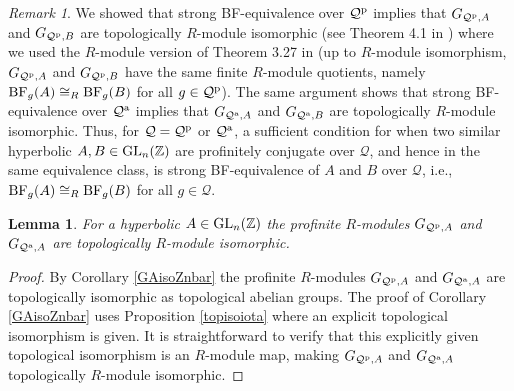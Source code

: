 \documentclass{amsart}
\theoremstyle{plain}
\newtheorem{lemma}[theorem]{Lemma}
\theoremstyle{definition}
\theoremstyle{remark}
\newtheorem{remark}{Remark}
\begin{document}
\begin{remark}\label{sufficient} We showed that strong {\rm BF}-equivalence over ${\mathcal Q}^{\rm p}$ implies that $G_{ {\mathcal Q}^{\rm p},A}$ and $G_{ {\mathcal Q}^{\rm p},B}$ are topologically $R$-module isomorphic (see Theorem 4.1 in \cite{BM12}) where we used the $R$-module version of Theorem 3.27 in \cite{RZ10} (up to $R$-module isomorphism, $G_{ {\mathcal Q}^{\rm p},A}$ and $G_{ {\mathcal Q}^{\rm p},B}$ have the same finite $R$-module quotients, namely ${\rm BF}_g(A) \cong_R {\rm BF}_g(B)$ for all $g\in {\mathcal Q}^{\rm p}$). The same argument shows that strong {\rm BF}-equivalence over ${\mathcal Q}^{\rm a}$ implies that $G_{ {\mathcal Q}^{\rm a},A}$ and $G_{ {\mathcal Q}^{\rm a},B}$ are topologically $R$-module isomorphic. Thus, for ${\mathcal Q} = {\mathcal Q}^{\rm p}$ or ${\mathcal Q}^{\rm a}$, a sufficient condition for when two similar hyperbolic $A,B\in {\rm GL}_n({\mathbb Z})$ are profinitely conjugate over ${\mathcal Q}$, and hence in the same equivalence class, is strong {\rm BF}-equivalence of $A$ and $B$ over ${\mathcal Q}$, i.e., ${\rm BF}_g(A) \cong_R {\rm BF}_g(B)$ for all $g\in {\mathcal Q}$. 
\end{remark}

\begin{lemma}\label{QminQ} For a hyperbolic $A\in {\rm GL}_n({\mathbb Z})$ the profinite $R$-modules $G_{ {\mathcal Q}^{\rm p},A}$ and $G_{{\mathcal Q}^{\rm a},A}$ are topologically $R$-module isomorphic.
\end{lemma}

\begin{proof} By Corollary \ref{GAisoZnbar} the profinite $R$-modules $G_{ {\mathcal Q}^{\rm p},A}$ and $G_{ {\mathcal Q}^{\rm a},A}$ are topologically isomorphic as topological abelian groups. The proof of Corollary \ref{GAisoZnbar} uses Proposition \ref{topisoiota} where an explicit topological isomorphism is given. It is straightforward to verify that this explicitly given topological isomorphism is an $R$-module map, making $G_{ {\mathcal Q}^{\rm p},A}$ and $G_{ {\mathcal Q}^{\rm a},A}$ topologically $R$-module isomorphic.
\end{proof}
\end{document}
